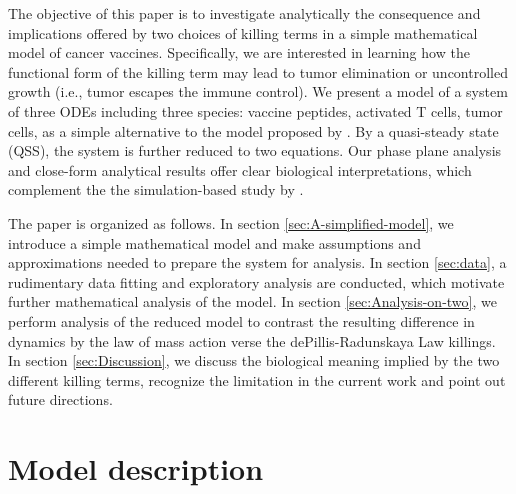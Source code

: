 \documentclass[review,authoryear]{elsarticle}
\begin{document}
The objective of this paper is to investigate analytically the consequence
and implications offered by two choices of killing terms in a simple mathematical
model of cancer vaccines. Specifically, we are interested in learning
how the functional form of the killing term may lead to tumor elimination
or uncontrolled growth (i.e., tumor escapes the immune control). We present
a model of a system of three ODEs
including three species: vaccine peptides, activated T cells, tumor
cells, as a simple alternative to the model proposed by \citet{Messan2021}. By a quasi-steady state (QSS), the system is further reduced
to two equations. Our phase plane analysis and close-form analytical
results offer clear biological interpretations, which complement the
the simulation-based study by \citet{Messan2021}. 

The paper is organized as follows. In section \ref{sec:A-simplified-model},
we introduce a simple mathematical model and make assumptions and approximations
needed to prepare the system for analysis. In section \ref{sec:data}, a rudimentary data fitting and exploratory analysis are conducted, which motivate further mathematical analysis of the model. In section \ref{sec:Analysis-on-two},
we perform analysis of the reduced model to contrast the resulting
difference in dynamics by the law of mass action verse the dePillis-Radunskaya
Law killings. In section \ref{sec:Discussion}, we discuss the biological
meaning implied by the two different killing terms, recognize the
limitation in the current work and point out future directions. 



\section{Model description \label{sec:A-simplified-model}}
\end{document}
